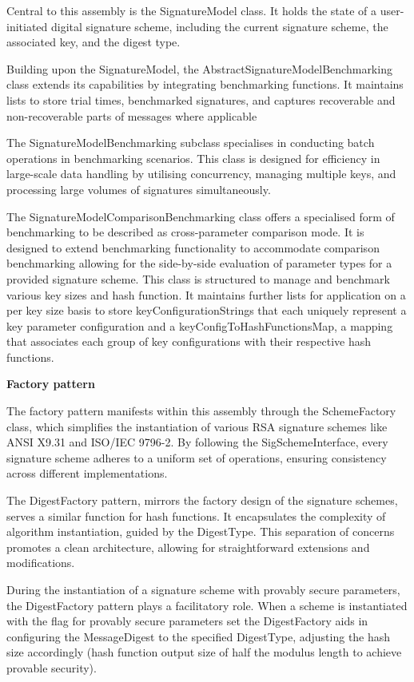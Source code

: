 \documentclass[]{final_report}
\theoremstyle{definition}
\begin{document}
Central to this assembly is the SignatureModel class. It holds the state of a user-initiated digital signature scheme, including the current signature scheme, the associated key, and the digest type. 

Building upon the SignatureModel, the AbstractSignatureModelBenchmarking class extends its capabilities by integrating benchmarking functions. It maintains lists to store trial times, benchmarked signatures, and captures recoverable and non-recoverable parts of messages where applicable

The SignatureModelBenchmarking subclass specialises in conducting batch operations in benchmarking scenarios. This class is designed for efficiency in large-scale data handling by utilising concurrency, managing multiple keys, and processing large volumes of signatures simultaneously.

The SignatureModelComparisonBenchmarking class offers a specialised form of benchmarking to be described as cross-parameter comparison mode. It is designed to extend benchmarking functionality to accommodate comparison benchmarking allowing for the side-by-side evaluation of parameter types for a provided signature scheme. This class is structured to manage and benchmark various key sizes and hash function. It maintains further lists for application on a per key size basis to store keyConfigurationStrings that each uniquely represent a key parameter configuration and a keyConfigToHashFunctionsMap, a mapping that associates each group of key configurations with their respective hash functions. 

\textbf{Factory pattern}

The factory pattern manifests within this assembly through the SchemeFactory class, which simplifies the instantiation of various RSA signature schemes like ANSI X9.31 and ISO/IEC 9796-2. By following the SigSchemeInterface, every signature scheme adheres to a uniform set of operations, ensuring consistency across different implementations.

The DigestFactory pattern, mirrors the factory design of the signature schemes, serves a similar function for hash functions. It encapsulates the complexity of algorithm instantiation, guided by the DigestType. This separation of concerns promotes a clean architecture, allowing for straightforward extensions and modifications.

During the instantiation of a signature scheme with provably secure parameters, the DigestFactory pattern plays a facilitatory role. When a scheme is instantiated with the flag for provably secure parameters set the DigestFactory aids in configuring the MessageDigest to the specified DigestType, adjusting the hash size accordingly (hash function output size of half the modulus length to achieve provable security).
\end{document}
